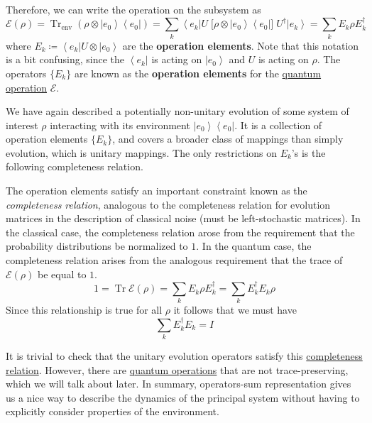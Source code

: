 \documentclass{article}
\DeclareMathOperator{\Tr}{Tr}
\newcommand{\ket}[1]{\ensuremath{\left|#1\right\rangle}}
\newcommand{\bra}[1]{\ensuremath{\left\langle#1\right|}}
\newcounter{definition}[section]
\begin{document}
    \begin{definition}
      \label{def:operation-sum-elements}
      Therefore, we can write the operation on the subsystem as
      \begin{equation}
        \mathcal{E} (\rho) = \Tr_{\mathrm{env}}(\rho \otimes \ket{e_0} \bra{e_0}) = \sum_{k} \bra{e_k} U \; \big[ \rho \otimes \ket{e_0} \bra{e_0} \big] \; U^\dagger \ket{e_k} = \sum_{k} E_k \rho E_k^\dagger
      \end{equation}
      where $E_k \coloneqq \bra{e_k} U \otimes \ket{e_0}$ are the \textbf{operation elements}. Note that this notation is a bit confusing, since the $\bra{e_k}$ is acting on $\ket{e_0}$ and $U$ is acting on $\rho$. The operators $\{E_k\}$ are known as the \textbf{operation elements} for the \hyperref[def:quantum-operation]{quantum operation} $\mathcal{E}$. 
    \end{definition}

    We have again described a potentially non-unitary evolution of some system of interest $\rho$ interacting with its environment $\ket{e_0} \bra{e_0}$. It is a collection of operation elements $\{E_k\}$, and covers a broader class of mappings than simply evolution, which is unitary mappings. The only restrictions on $E_k$'s is the following completeness relation. 

    \begin{lemma}
      \label{thm:completeness-relation}
      The operation elements satisfy an important constraint known as the \textit{completeness relation}, analogous to the completeness relation for evolution matrices in the description of classical noise (must be left-stochastic matrices). In the classical case, the completeness relation arose from the requirement that the probability distributions be normalized to $1$. In the quantum case, the completeness relation arises from the analogous requirement that the trace of $\mathcal{E}(\rho)$ be equal to $1$. 
      \begin{equation}
        1 = \Tr \mathcal{E}(\rho) = \sum_k E_k \rho E_k^\dagger = \sum_k E_k^\dagger E_k \rho 
      \end{equation}
      Since this relationship is true for all $\rho$ it follows that we must have 
      \begin{equation}
        \sum_k E_k^\dagger E_k = I
      \end{equation}
    \end{lemma}

    It is trivial to check that the unitary evolution operators satisfy this \hyperref[thm:completeness-relation]{completeness relation}. However, there are \hyperref[def:quantum-operation]{quantum operations} that are not trace-preserving, which we will talk about later.  In summary, operators-sum representation gives us a nice way to describe the dynamics of the principal system without having to explicitly consider properties of the environment. 
\end{document}
